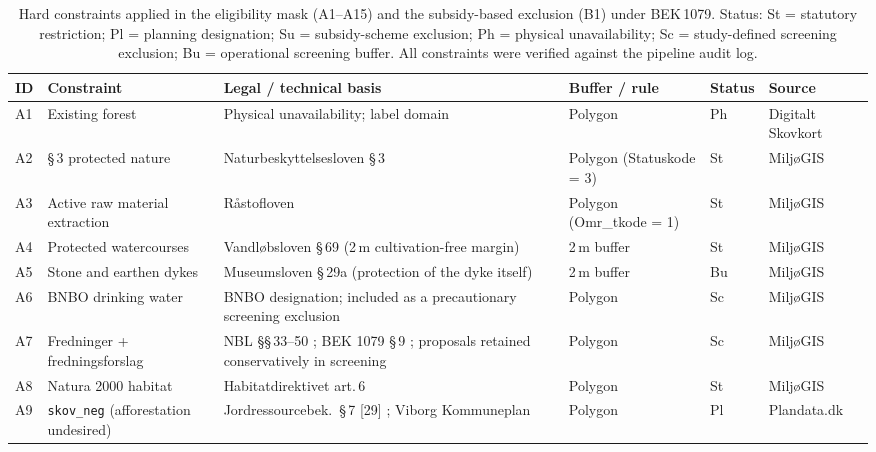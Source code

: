 \documentclass[land,article,submit,moreauthors]{Definitions/mdpi}
\begin{document}
\begin{table}[H]
\centering
\caption{Hard constraints applied in the eligibility mask (A1--A15) and the subsidy-based exclusion (B1) under BEK\,1079. Status: St = statutory restriction; Pl = planning designation; Su = subsidy-scheme exclusion; Ph = physical unavailability; Sc = study-defined screening exclusion; Bu = operational screening buffer. All constraints were verified against the pipeline audit log.}
\label{tab:constraints}
\footnotesize
\setlength{\tabcolsep}{3.5pt}
\renewcommand{\arraystretch}{1.15}
\begin{tabular}{@{} p{0.5cm} p{3.2cm} p{3.9cm} p{2.0cm} p{0.6cm} p{1.9cm} @{}}
\toprule
\textbf{ID} & \textbf{Constraint} & \textbf{Legal / technical basis} & \textbf{Buffer / rule} & \textbf{Status} & \textbf{Source} \\
\midrule
A1  & Existing forest
    & Physical unavailability; label domain
    & Polygon
    & Ph
    & Digitalt Skovkort \\
A2  & \S\,3 protected nature
    & Naturbeskyttelsesloven \S\,3 \citep{nbl_lbk2024}
    & Polygon (Statuskode = 3)
    & St
    & Milj{\o}GIS \\
A3  & Active raw material extraction
    & R{\aa}stofloven \citep{raastofloven2024}
    & Polygon (Omr\_tkode = 1)
    & St
    & Milj{\o}GIS \\
A4  & Protected watercourses
    & Vandl{\o}bsloven \S\,69 (2\,m cultivation-free margin) \citep{vandloebsloven2024}
    & 2\,m buffer
    & St
    & Milj{\o}GIS \\
A5  & Stone and earthen dykes
    & Museumsloven \S\,29a (protection of the dyke itself) \citep{museumsloven}
    & 2\,m buffer
    & Bu
    & Milj{\o}GIS \\
A6  & BNBO drinking water
    & BNBO designation; included as a precautionary screening exclusion
    & Polygon
    & Sc
    & Milj{\o}GIS \\
A7  & Fredninger + fredningsforslag
    & NBL \S\S\,33--50 \citep{nbl_lbk2024}; BEK 1079 \S\,9 \citep{bek1079_2025}; proposals retained conservatively in screening
    & Polygon
    & Sc
    & Milj{\o}GIS \\
A8  & Natura 2000 habitat
    & Habitatdirektivet art.\,6 \citep{habitatdir1992}
    & Polygon
    & St
    & Milj{\o}GIS \\
A9  & \texttt{skov\_neg} (afforestation undesired)
    & Jordressourcebek.\ \S\,7 [29] \citep{jordressourcebek}; Viborg Kommuneplan \citep{viborgkommuneplan2025}
    & Polygon
    & Pl
    & Plandata.dk \\

\end{tabular}
\end{table}
\end{document}
